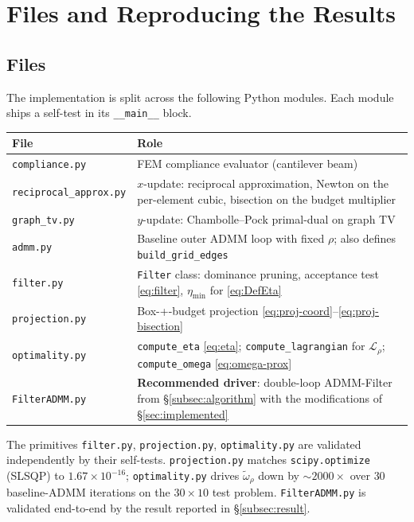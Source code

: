 \documentclass[11pt]{article}
\begin{document}
\section{Files and Reproducing the Results}\label{sec:reproduction}

\subsection{Files}

The implementation is split across the following Python modules. Each module ships a self-test in its \verb|__main__| block.

\medskip
\begin{center}
\begin{tabular}{@{}lp{8.5cm}@{}}
\toprule
\textbf{File} & \textbf{Role} \\
\midrule
\texttt{compliance.py}         & FEM compliance evaluator (cantilever beam) \\[2pt]
\texttt{reciprocal\_approx.py} & $x$-update: reciprocal approximation, Newton on the per-element cubic, bisection on the budget multiplier \\[2pt]
\texttt{graph\_tv.py}          & $y$-update: Chambolle--Pock primal-dual on graph TV \\[2pt]
\texttt{admm.py}               & Baseline outer ADMM loop with fixed $\rho$; also defines \texttt{build\_grid\_edges} \\[2pt]
\texttt{filter.py}             & \texttt{Filter} class: dominance pruning, acceptance test \eqref{eq:filter}, $\eta_{\min}$ for \eqref{eq:DefEta} \\[2pt]
\texttt{projection.py}         & Box-+-budget projection \eqref{eq:proj-coord}--\eqref{eq:proj-bisection} \\[2pt]
\texttt{optimality.py}         & \texttt{compute\_eta} \eqref{eq:eta}; \texttt{compute\_lagrangian} for $\mathcal{L}_\rho$; \texttt{compute\_omega} \eqref{eq:omega-prox} \\[2pt]
\texttt{FilterADMM.py}         & \textbf{Recommended driver}: double-loop ADMM-Filter from \S\ref{subsec:algorithm} with the modifications of \S\ref{sec:implemented} \\
\bottomrule
\end{tabular}
\end{center}

\medskip\noindent
The primitives \texttt{filter.py}, \texttt{projection.py}, \texttt{optimality.py} are validated independently by their self-tests. \texttt{projection.py} matches \texttt{scipy.optimize} (SLSQP) to $1.67\times10^{-16}$; \texttt{optimality.py} drives $\widetilde{\omega}_\rho$ down by $\sim 2000\times$ over $30$ baseline-ADMM iterations on the $30\times10$ test problem. \texttt{FilterADMM.py} is validated end-to-end by the result reported in \S\ref{subsec:result}.
\end{document}
